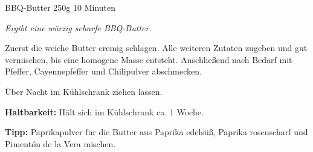\documentclass[
  DIV=11,%
  pagesize,%
  fontsize=11pt,%
  paper=a4,%
]{scrartcl}
\begin{document}
\begin{recipe}{BBQ-Butter} {250g} {10 Minuten}

\freeform
\textit{Ergibt eine würzig scharfe BBQ-Butter.}


Zuerst die weiche Butter cremig schlagen.
Alle weiteren Zutaten zugeben und gut vermischen, bis eine homogene Masse entsteht.
Anschließend nach Bedarf mit Pfeffer, Cayennepfeffer und Chilipulver abschmecken.

\newstep
Über Nacht im Kühlschrank ziehen lassen.

\freeform
\hrulefill

\freeform 
\textbf{Haltbarkeit:}
Hält sich im Kühlschrank ca. 1 Woche.

\freeform 
\textbf{Tipp:}
Paprikapulver für die Butter aus Paprika edelsüß, Paprika rosenscharf und Pimentón de la Vera mischen.

\end{recipe}
\end{document}

